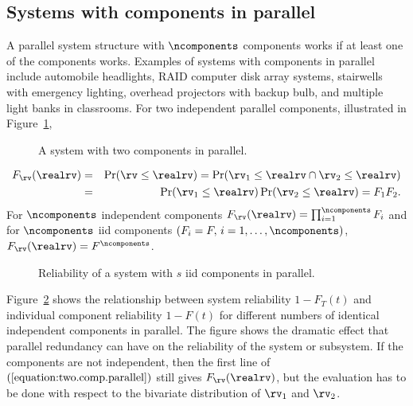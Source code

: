 \subsection{Systems with components in parallel}
A parallel system structure with $\ncomponents$ components works if at
least one of the components works.  Examples of systems with
components in parallel include automobile headlights, RAID computer
disk array systems, stairwells with emergency lighting, overhead
projectors with backup bulb, and multiple light banks in classrooms.
For two independent parallel components,
illustrated in Figure~\ref{figure:system.parallelfig.ps},
\begin{figure}
\caption{A system with two components in parallel.}
\label{figure:system.parallelfig.ps}
\end{figure}
\begin{eqnarray}
\label{equation:two.comp.parallel}
F_{\rv}(\realrv)&=&\Pr( \rv \le \realrv)
=\Pr(\rv_{1} \le  \realrv \cap \rv_{2} \le \realrv)
\\ \nonumber
&=&\Pr(\rv_{1} \le \realrv) \Pr(\rv_{2} \le \realrv)
=F_{1} F_{2}.
\end{eqnarray}
For $\ncomponents$ independent components
$F_{\rv}(\realrv)=\prod_{i=1}^{\ncomponents} F_{i}$ and for
$\ncomponents$ iid components $(F_{i}=F, \, i=1, \ldots,
\ncomponents)$, $F_{\rv}(\realrv)=F^{\ncomponents}$.

\begin{figure}
\caption{Reliability of a system with $s$ iid
components in parallel.}
\label{figure:parallel.effect.ps}
\end{figure}
Figure~\ref{figure:parallel.effect.ps} shows the relationship between
system reliability $1-F_{T}(t)$ and individual component reliability
$1-F(t)$ for different numbers of identical independent components in
parallel.  The figure shows the dramatic effect that parallel
redundancy can have on the reliability of the system or subsystem.
If the components are not independent, then the first line of
$(\ref{equation:two.comp.parallel})$ still gives $F_{\rv}(\realrv)$,
but the evaluation has to be done with respect to the bivariate
distribution of $\rv_{1}$ and $\rv_{2}$.

